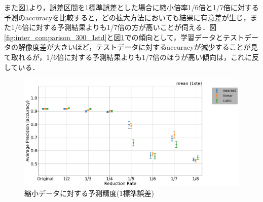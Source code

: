 \documentclass[a4j, 11pt]{jreport}
\begin{document}
また図\ref{fig:inter_comparison_300_1ste}より，誤差区間を1標準誤差とした場合に縮小倍率1/6倍と1/7倍に対する予測のaccuracyを比較すると，どの拡大方法においても結果に有意差が生じ，また1/6倍に対する予測結果よりも1/7倍の方が高いことが伺える．図\ref{fig:inter_comparison_300_1std}と図\ref{fig:inter_comparison_300_1ste}での傾向として，学習データとテストデータの解像度差が大きいほど，テストデータに対するaccuracyが減少することが見て取れるが，1/6倍に対する予測結果よりも1/7倍のほうが高い傾向は，これに反している．

\begin{figure}[H]
  \centering
  \includegraphics[width=16cm]{images/5syou/print_errorbar/print_errorbar_inter_comparison/acc_with_errorbar_syuron5_inter_comparison_900epoch_30run_300_acc_max_ste1sigma.png}
  \caption{縮小データに対する予測精度(1標準誤差)}
  \label{fig:inter_comparison_300_1ste}
\end{figure}


 
\end{document}

